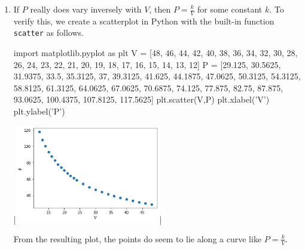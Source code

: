 \begin{example}
\begin{enumerate}
\begin{mdframed}[default,backgroundcolor=gray!40,roundcorner=8pt]
\begin{mmaCell}[moregraphics={moreig={scale=.4}}]{Output}
\end{mmaCell}
\end{mdframed}
\fi

\ifpython
\item If $P$ really does vary inversely with $V$, then $P = \frac{k}{V}$ for some constant $k$.  To verify this, we create a scatterplot in Python with the built-in function \lstinline{scatter} as follows.
\begin{pyin}
import matplotlib.pyplot as plt
V = [48, 46, 44, 42, 40, 38, 36, 34, 32, 30, 28, 26, 24, 23, 22, 21, 20, 19, 18, 17,
    16, 15, 14, 13, 12]
P = [29.125, 30.5625, 31.9375, 33.5, 35.3125, 37, 39.3125, 41.625, 44.1875, 47.0625,
    50.3125, 54.3125, 58.8125, 61.3125, 64.0625, 67.0625, 70.6875, 74.125, 77.875,
    82.75, 87.875, 93.0625, 100.4375, 107.8125, 117.5625]
plt.scatter(V,P)
plt.xlabel('V')
plt.ylabel('P')
\end{pyin}
\begin{pyout}
|\includegraphics[width=0.5\textwidth]{fig_algebraic_12_Python}|
\end{pyout}

From the resulting plot, the points do seem to lie along a curve like $P = \frac{k}{V}$.


\end{enumerate}
\end{example}
